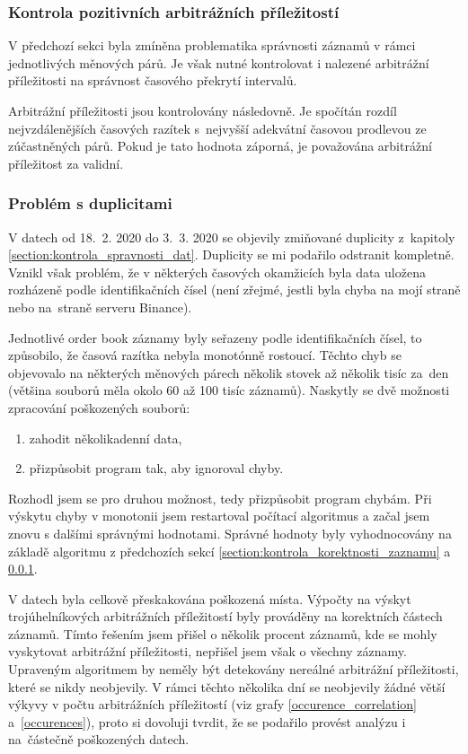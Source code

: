 \documentclass[thesis=B,czech]{FITthesis}[2019/03/21]
\begin{document}
\subsubsection{Kontrola pozitivních arbitrážních příležitostí}
\label{section:kontrola_pozitivnich_arbitraznich_prilezitosti}
V předchozí sekci byla zmíněna problematika správnosti záznamů v rámci jednotlivých měnových párů. Je však nutné kontrolovat i nalezené arbitrážní příležitosti na správnost časového překrytí intervalů. 

Arbitrážní příležitosti jsou kontrolovány následovně. Je spočítán rozdíl nejvzdálenějších časových razítek s~nejvyšší adekvátní časovou prodlevou ze zúčastněných párů. Pokud je tato hodnota záporná, je považována arbitrážní příležitost za validní.

\subsubsection{Problém s duplicitami}
V datech od 18.~2. 2020 do 3.~3. 2020 se objevily zmiňované duplicity z~kapitoly \ref{section:kontrola_spravnosti_dat}. Duplicity se mi podařilo odstranit kompletně. Vznikl však problém, že v některých časových okamžicích byla data uložena rozházeně podle identifikačních čísel (není zřejmé, jestli byla chyba na mojí straně nebo na~straně serveru Binance).

Jednotlivé order book záznamy byly seřazeny podle identifikačních čísel, to způsobilo, že časová razítka nebyla monotónně rostoucí. Těchto chyb se objevovalo na některých měnových párech několik stovek až několik tisíc za~den (většina souborů měla okolo 60 až 100 tisíc záznamů). Naskytly se dvě možnosti zpracování poškozených souborů:
\begin{enumerate}
    \item zahodit několikadenní data,
    \item přizpůsobit program tak, aby ignoroval chyby.
\end{enumerate}

Rozhodl jsem se pro druhou možnost, tedy přizpůsobit program chybám. Při výskytu chyby v monotonii jsem restartoval počítací algoritmus a začal jsem znovu s dalšími správnými hodnotami. Správné hodnoty byly vyhodnocovány na základě algoritmu z předchozích sekcí \ref{section:kontrola_korektnosti_zaznamu} a \ref{section:kontrola_pozitivnich_arbitraznich_prilezitosti}.

V datech byla celkově přeskakována poškozená místa. Výpočty na výskyt trojúhelníkových arbitrážních příležitostí byly prováděny na korektních částech záznamů. Tímto řešením jsem přišel o několik procent záznamů, kde se mohly vyskytovat arbitrážní příležitosti, nepřišel jsem však o všechny záznamy. Upraveným algoritmem by neměly být detekovány nereálné arbitrážní příležitosti, které se nikdy neobjevily. V rámci těchto několika dní se neobjevily žádné větší výkyvy v počtu arbitrážních příležitostí (viz grafy \ref{occurence_correlation} a~\ref{occurences}), proto si dovoluji tvrdit, že se podařilo provést analýzu i na~částečně poškozených datech.
\end{document}
